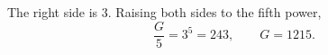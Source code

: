 The right side is $3$. Raising both sides to the fifth power,
\[\dfrac {G}{5}=3^5=243,\qquad G=\boxed{1215}.\]

